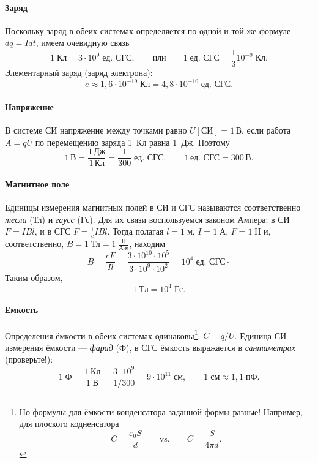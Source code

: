 \paragraph{Заряд}

Поскольку заряд в обеих системах определяется по одной и той же формуле
$dq=Idt$, имеем очевидную связь
\[
1\;\text{Кл}=3\cdot10^{9}\;\text{ед. СГС},\qquad\text{или}\qquad1\;\text{ед. СГС}=\frac{1}{3}10^{-9}\;\text{Кл}.
\]
Элементарный заряд (заряд электрона):
\[
e\approx1{,}6\cdot10^{-19}\;\text{Кл}=4{,}8\cdot10^{-10}\;\text{ед. СГС}.
\]


\paragraph{Напряжение}

В системе СИ напряжение между точками равно $U[\text{СИ}]=1\,\text{В}$,
если работа $A=qU$ по перемещению заряда 1~Кл равна 1~Дж. Поэтому
\[
1\,\text{В}=\frac{1\,\text{Дж}}{1\,\text{Кл}}=
\frac{1}{300}\;\text{ед. СГС},\qquad1\,\text{ед. СГС}=300\,\text{В}.
\]


\paragraph{Магнитное поле}

Единицы измерения магнитных полей в СИ и СГС называются соответственно
\emph{тесла} (Тл) и \emph{гаусс} (Гс). Для их связи воспользуемся
законом Ампера: в СИ $F=IBl$, и в СГС $F=\frac{1}{c}IBl$. Тогда
полагая $l=1\;\text{м}$, $I=1\;\text{А}$, $F=1\;\text{Н}$ и, соответственно,
$B=1\;\text{Тл}=1\;\frac{\text{Н}}{\text{А}\cdot\text{м}}$, находим
\[
B=\frac{cF}{Il}=\frac{3\cdot10^{10}\cdot10^{5}}{3\cdot10^{9}\cdot10^{2}}=
10^{4}\;\text{ед. СГС}\cdot
\]
Таким образом,
\[
1\;\text{Тл}=10^{4}\;\text{Гс}.
\]


\paragraph{Емкость}

Определения ёмкости в обеих системах одинаковы\footnote{Но формулы для
ёмкости конденсатора заданной формы разные! Например, для плоского
кодненсатора
\[
C=\frac{\varepsilon_{0}S}{d}\qquad\mathrm{vs.}\qquad C=\frac{S}{4\pi d}.
\]
}: $C=q/U$. Единица СИ измерения ёмкости --- \emph{фарад} (Ф), в
СГС ёмкость выражается в \emph{сантиметрах} (проверьте!):
\[
1\;\text{Ф}=\frac{1\;\text{Кл}}{1\;\text{В}}=\frac{3\cdot10^{9}}{1/300}=
9\cdot10^{11}\;\text{см},\qquad1\;\text{см}\approx1{,}1\;\text{пФ}.
\]


